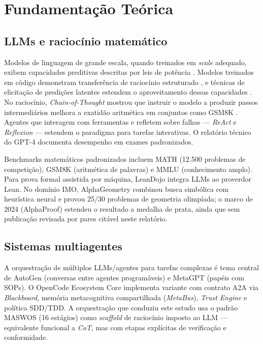 \chapter{Fundamentação Teórica}

\section{LLMs e raciocínio matemático}

Modelos de linguagem de grande escala, quando treinados em \textit{scale}
adequado, exibem capacidades preditivas descritas por leis de potência
\cite{hoffmann_chinchilla}. Modelos treinados em código demonstram
transferência de raciocínio estruturado \cite{chen_codex}, e técnicas de
elicitação de predições latentes estendem o aproveitamento dessas
capacidades \cite{ryoo_eliciting}. No raciocínio, \textit{Chain-of-Thought}
\cite{wei_cot} mostrou que instruir o modelo a produzir passos intermediários
melhora a exatidão aritmética em conjuntos como GSM8K \cite{cobbe_gsm8k}.
Agentes que interagem com ferramentas e refletem sobre falhas —
\textit{ReAct} \cite{yao_react} e \textit{Reflexion} \cite{shinn_reflexion} —
estendem o paradigma para tarefas interativas. O relatório técnico do GPT-4
\cite{openai_gpt4} documenta desempenho em exames padronizados.

Benchmarks matemáticos padronizados incluem MATH \cite{hendrycks_math}
(12.500 problemas de competição), GSM8K \cite{cobbe_gsm8k} (aritmética de
palavras) e MMLU \cite{hendrycks_mmlu} (conhecimento amplo). Para prova
formal assistida por máquina, LeanDojo \cite{yang_leandojo} integra LLMs ao
proverdor Lean. No domínio IMO, AlphaGeometry \cite{alpha_geometry}
combinou busca simbólica com heurística neural e provou 25/30 problemas de
geometria olimpíada; o marco de 2024 (AlphaProof) estendeu o resultado a
medalha de prata, ainda que sem publicação revisada por pares citável neste
relatório.

\section{Sistemas multiagentes}

A orquestração de múltiplos LLMs/agentes para tarefas complexas é tema
central de AutoGen \cite{wu_autogen} (conversas entre agentes programáveis) e
MetaGPT \cite{hong_metagpt} (papéis com SOPs). O OpenCode Ecosystem Core
implementa variante com contrato A2A via \textit{Blackboard}, memória
metacognitiva compartilhada (\textit{MetaBus}), \textit{Trust Engine} e
política SDD/TDD. A orquestração que conduziu este estudo usa o padrão
MASWOS (16 estágios) como \textit{scaffold} de raciocínio imposto ao LLM —
equivalente funcional a \textit{CoT}, mas com etapas explícitas de
verificação e conformidade.

